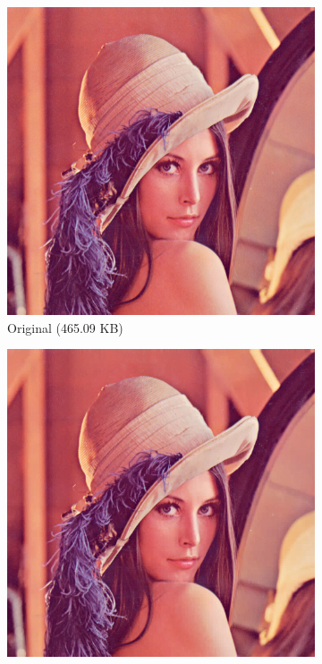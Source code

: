 \documentclass[12pt]{article}
\theoremstyle{definition}
\begin{document}
  \begin{figure}
    \centering
    \begin{subfigure}[t]{.485\linewidth}
      \centering
      \includegraphics[width=.93\linewidth]{figs/lena.png}
      \caption{Original (465.09 KB)}
    \end{subfigure}
    \begin{subfigure}[t]{.485\linewidth}
      \centering
      \includegraphics[width=.93\linewidth]{figs/lena_haar_5.png}

\end{subfigure}
\end{figure}
\end{document}
